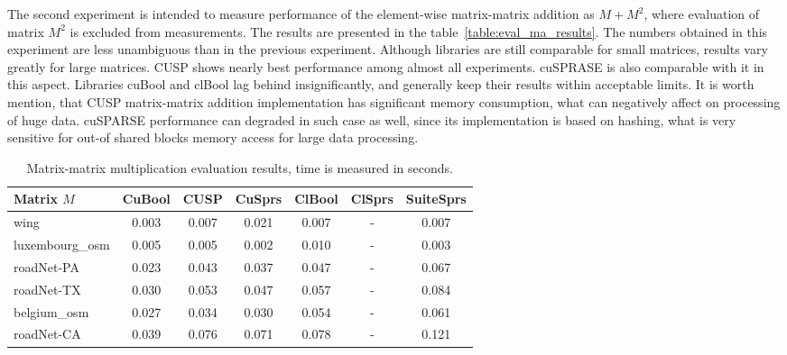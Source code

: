 The second experiment is intended to measure performance of the element-wise matrix-matrix addition as $M + M^2$, 
where evaluation of matrix $M^2$ is excluded from measurements.  
The results are presented in the table~\ref{table:eval_ma_results}. 
The numbers obtained in this experiment are less unambiguous than in the previous experiment. 
Although libraries are still comparable for small matrices, results vary greatly for large matrices. 
CUSP shows nearly best performance among almost all experiments. 
cuSPRASE is also comparable with it in this aspect. 
Libraries cuBool and clBool lag behind insignificantly, and generally keep their results within acceptable limits. 
It is worth mention, that CUSP matrix-matrix addition implementation has significant memory consumption,
what can negatively affect on processing of huge data. 
cuSPARSE performance can degraded in such case as well, since its implementation is based on hashing, 
what is very sensitive for out-of shared blocks memory access for large data processing.  

{\setlength{\tabcolsep}{0.3em}
\begin{table}[t]
\centering
{
\caption{Matrix-matrix multiplication evaluation results, time is measured in seconds.}
\label{table:eval_mm_results}
\scriptsize
{}
\begin{tabular}{|l|c|c|c|c|c|c|}
\hline

Matrix $M$      & CuBool  & CUSP    & CuSprs  & ClBool  & ClSprs  & SuiteSprs \\
\hline
\hline
wing            & 0.003   & 0.007   & 0.021   & 0.007   & -       & 0.007   \\
luxembourg\_osm & 0.005   & 0.005   & 0.002   & 0.010   & -       & 0.003   \\
roadNet-PA      & 0.023   & 0.043   & 0.037   & 0.047   & -       & 0.067   \\
roadNet-TX      & 0.030   & 0.053   & 0.047   & 0.057   & -       & 0.084   \\
belgium\_osm    & 0.027   & 0.034   & 0.030   & 0.054   & -       & 0.061   \\
roadNet-CA      & 0.039   & 0.076   & 0.071   & 0.078   & -       & 0.121   \\

\hline
\end{tabular}
}
\end{table}
}

